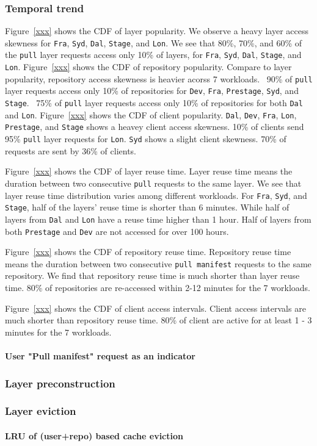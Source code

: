 \subsubsection{Temporal trend}

Figure~\ref{xxx} shows the CDF of layer popularity.
We observe a heavy layer access skewness for \texttt{Fra}, \texttt{Syd}, \texttt{Dal}, \texttt{Stage}, 
and \texttt{Lon}.
We see that 80\%, 70\%, and 60\% of the \texttt{pull} layer requests access only 10\% of layers, 
for \texttt{Fra}, \texttt{Syd}, \texttt{Dal}, \texttt{Stage}, 
and \texttt{Lon}.
Figure~\ref{xxx} shows the CDF of repository popularity.
Compare to layer popularity, 
repository access skewness is heavier acorss 7 workloads.
~90\% of \texttt{pull} layer requests access only 10\% of repositories for 
\texttt{Dev}, \texttt{Fra}, \texttt{Prestage}, \texttt{Syd}, and \texttt{Stage}.
~75\% of \texttt{pull} layer requests access only 10\% of repositories for
both \texttt{Dal} and \texttt{Lon}.
Figure~\ref{xxx} shows the CDF of client popularity.
\texttt{Dal}, \texttt{Dev}, \texttt{Fra}, \texttt{Lon}, \texttt{Prestage}, and \texttt{Stage}
shows a heavey client access skewness.
10\% of clients send 95\% \texttt{pull} layer requests for \texttt{Lon}.
\texttt{Syd} shows a slight client skewness. 70\% of requests are sent by 36\% of clients.

Figure~\ref{xxx} shows the CDF of layer reuse time. 
Layer reuse time means the duration between two consecutive \texttt{pull} requests to the same layer.
We see that layer reuse time distribution varies among different workloads.
For \texttt{Fra}, \texttt{Syd}, and \texttt{Stage},
half of the layers' reuse time is shorter than 6 minutes.
While half of layers from \texttt{Dal} and \texttt{Lon} have a reuse time higher than 1 hour.
Half of layers from both \texttt{Prestage} and \texttt{Dev} are not accessed for over 100 hours.

Figure~\ref{xxx} shows the CDF of repository reuse time.
Repository reuse time means the duration between two consecutive \texttt{pull manifest} requests to the same repository.
We find that repository reuse time is much shorter than layer reuse time.
80\% of repositories are re-accessed within 2-12 minutes for the 7 workloads.

Figure~\ref{xxx} shows the CDF of client access intervals.
Client access intervals are much shorter than repository reuse time.
80\% of client are active for at least 1 - 3 minutes for the 7 workloads. 
   

\paragraph{User "Pull manifest" request as an indicator}

\subsubsection{Layer preconstruction}



\subsubsection{Layer eviction}


\paragraph{LRU of (user+repo) based cache eviction}

